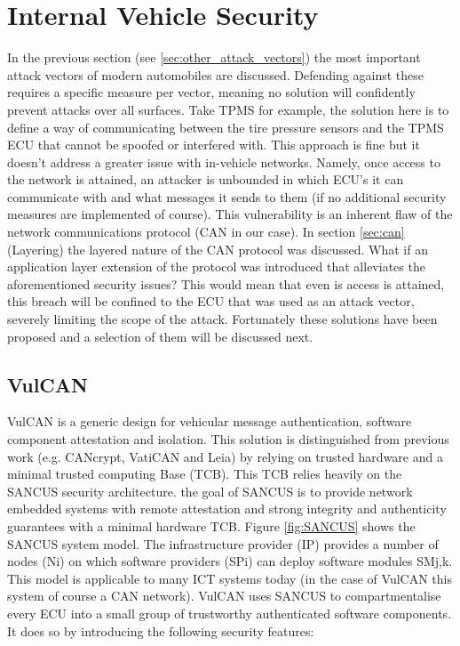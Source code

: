 \section{Internal Vehicle Security}
\label{sec:internal_vehicle_security}

In the previous section (see \ref{sec:other_attack_vectors}) the most important attack vectors of modern automobiles are discussed. Defending against these requires a specific measure per vector, meaning no solution will confidently prevent attacks over all surfaces. Take TPMS for example, the solution here is to define a way of communicating between the tire pressure sensors and the TPMS ECU that cannot be spoofed or interfered with. This approach is fine but it doesn't address a greater issue with in-vehicle networks. Namely, once access to the network is attained, an attacker is unbounded in which ECU's it can communicate with and what messages it sends to them (if no additional security measures are implemented of course). This vulnerability is an inherent flaw of the network communications protocol (CAN in our case). In section \ref{sec:can} (Layering) the layered nature of the CAN protocol was discussed. What if an application layer extension of the protocol was introduced that alleviates the aforementioned security issues? This would mean that even is access is attained, this breach will be confined to the ECU that was used as an attack vector, severely limiting the scope of the attack. Fortunately these solutions have been proposed and a selection of them will be discussed next.

\subsection{VulCAN}
\label{subsec:vulcan}
 
VulCAN is a generic design for vehicular message authentication, software component attestation and isolation. This solution is distinguished from previous work (e.g. CANcrypt\cite{Pfeiffer}, VatiCAN\cite{VatiCAN} and Leia\cite{Leia}) by relying on trusted hardware and a minimal trusted computing Base (TCB). This TCB relies heavily on the SANCUS\cite{Sancus} security architecture. the goal of SANCUS is to provide network embedded systems with remote attestation and strong integrity and authenticity guarantees with a minimal hardware TCB. Figure \ref{fig:SANCUS} shows the SANCUS system model. The infrastructure provider (IP) provides a number of nodes (Ni) on which software providers (SPi) can deploy software modules SMj,k. This model is applicable to many ICT systems today (in the case of VulCAN this system of course a CAN network).\cite{Sancus} VulCAN uses SANCUS to compartmentalise every ECU into a small group of trustworthy authenticated software components. It does so by introducing the following security features: 

